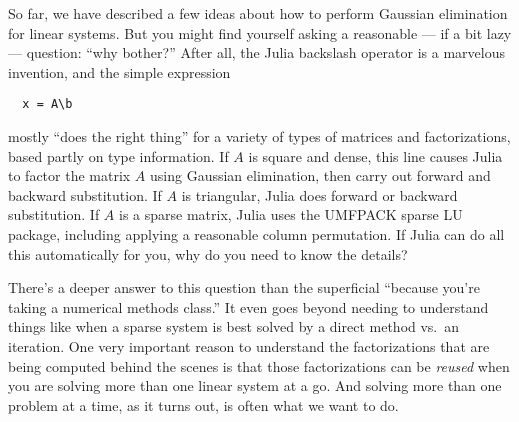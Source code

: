 \documentclass[12pt, leqno]{article}
\begin{document}
So far, we have described a few ideas about how to perform Gaussian
elimination for linear systems.  But you might find yourself asking a
reasonable --- if a bit lazy --- question: ``why bother?''  After all,
the Julia backslash operator is a marvelous invention, and the simple
expression
\begin{lstlisting}
  x = A\b
\end{lstlisting}
mostly ``does the right thing'' for a variety of types of matrices
and factorizations, based partly on type information.
If $A$ is square and dense, this line causes Julia to factor the
matrix $A$ using Gaussian elimination, then carry out forward and
backward substitution.  If $A$ is triangular, Julia
does forward or backward substitution.
If $A$ is a sparse matrix, Julia uses the UMFPACK sparse LU
package, including applying a reasonable column permutation.  If
Julia can do all this automatically for you, why do you need to know
the details?

There's a deeper answer to this question than the superficial
``because you're taking a numerical methods class.''  It even
goes beyond needing to understand things like when a sparse system
is best solved by a direct method vs.~an iteration.  One very
important reason to understand the factorizations that are being
computed behind the scenes is that those factorizations can be
{\em reused} when you are solving more than one linear system at a go.
And solving more than one problem at a time, as it turns out, is often
what we want to do.
\end{document}

